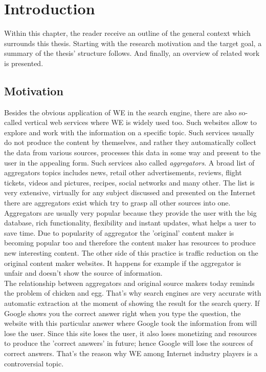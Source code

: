 \chapter{Introduction}
Within this chapter, the reader receive an outline of the general context which surrounds this thesis. Starting with the research motivation and the target goal, a summary of the thesis' structure follows. And finally, an overview of related work is presented.  


\section{Motivation}
Besides the obvious application of WE in the search engine, there are also so-called vertical web services where WE is widely used too. Such websites allow to explore and work with the information on a specific topic. Such services usually do not produce the content by themselves, and rather they automatically collect the data from various sources, processes this data in some way and present to the user in the appealing form. Such services also called \textit{aggregators}. A broad list of aggregators topics includes news, retail other advertisements, reviews, flight tickets, videos and pictures, recipes, social networks and many other. The list is very extensive, virtually for any subject discussed and presented on the Internet there are aggregators exist which try to grasp all other sources into one. \\

Aggregators are usually very popular because they provide the user with the big database, rich functionality, flexibility and instant updates, what helps a user to save time. Due to popularity of aggregator the 'original' content maker is becoming popular too and therefore the content maker has resources to produce new interesting content. The other side of this practice is traffic reduction on the original content maker websites. It happens for example if the aggregator is unfair and doesn't show the source of information. \\

The relationship between aggregators and original source makers today reminds the problem of chicken and egg. That's why search engines are very accurate with automatic extraction at the moment of showing the result for the search query. If Google shows you the correct answer right when you type the question, the website with this particular answer where Google took the information from will lose the user. Since this site loses the user, it also loses monetizing and resources to produce the 'correct answers' in future; hence Google will lose the sources of correct answers. That's the reason why WE among Internet industry players is a controversial topic.\\

